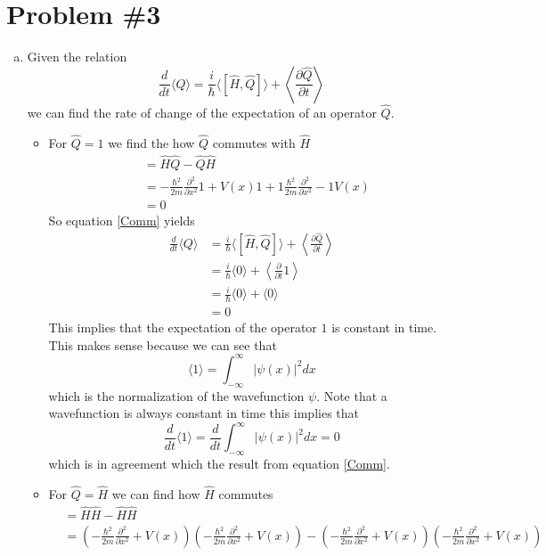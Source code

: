 \documentclass[11pt]{article}
\numberwithin{equation}{section}
\newcommand{\expt}[1]{\langle{#1}\rangle}
\begin{document}
\section{Problem \#3}
\begin{enumerate}[(a)]
\item
Given the relation 
\begin{equation}
\frac{d}{dt}\expt{Q} = \frac{i}{\hbar}\expt{[\hat{H},\hat{Q}]}+\left\langle\frac{\partial\hat{Q}}{\partial t}\right\rangle
\label{Comm}
\end{equation}
we can find the rate of change of the expectation of an operator $\hat{Q}$.
\begin{itemize}
\item For $\hat{Q} = 1$ we find the how $\hat{Q}$ commutes with $\hat{H}$ 
\begin{align*}
[\hat{H},\hat{Q}] &= \hat{H}\hat{Q} - \hat{Q}\hat{H}\\
&= -\frac{\hbar^2}{2m}\frac{\partial^2}{\partial x^2}1 +V(x)1 + 1\frac{\hbar^2}{2m}\frac{\partial^2}{\partial x^2} - 1V(x)\\
&= 0
\end{align*}
So equation \ref{Comm} yields
\begin{align*}
\frac{d}{dt}\expt{Q} &= \frac{i}{\hbar}\expt{[\hat{H},\hat{Q}]}+\left\langle\frac{\partial\hat{Q}}{\partial t}\right\rangle\\
&= \frac{i}{\hbar}\expt{0}+\left\langle\frac{\partial}{\partial t}1\right\rangle\\
&= \frac{i}{\hbar}\expt{0}+\expt{0}\\
&= 0
\end{align*}
This implies that the expectation of the operator $1$ is constant in time. This makes sense because we can see that 
$$\expt{1} = \int_{-\infty}^{\infty}|\psi(x)|^2dx$$
which is the normalization of the wavefunction $\psi$. Note that a wavefunction is always constant in time this implies that
$$\frac{d}{dt}\expt{1} = \frac{d}{dt}\int_{-\infty}^{\infty}|\psi(x)|^2dx=0$$
which is in agreement which the result from equation \ref{Comm}.
\item For $\hat{Q}=\hat{H}$ we can find how $\hat{H}$ commutes 
\begin{align*}
[\hat{H},\hat{H}] &= \hat{H}\hat{H} - \hat{H}\hat{H}\\
&= \left(-\frac{\hbar^2}{2m}\frac{\partial^2}{\partial x^2}+V(x)\right)\left(-\frac{\hbar^2}{2m}\frac{\partial^2}{\partial x^2}+V(x)\right) - \left(-\frac{\hbar^2}{2m}\frac{\partial^2}{\partial x^2}+V(x)\right)\left(-\frac{\hbar^2}{2m}\frac{\partial^2}{\partial x^2}+V(x)\right)\\

\end{align*}
\end{itemize}
\end{enumerate}
\end{document}
